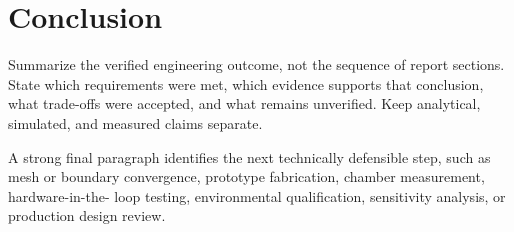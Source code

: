 \chapter{Conclusion}

Summarize the verified engineering outcome, not the sequence of report sections. State
which requirements were met, which evidence supports that conclusion, what trade-offs
were accepted, and what remains unverified. Keep analytical, simulated, and measured
claims separate.

A strong final paragraph identifies the next technically defensible step, such as mesh
or boundary convergence, prototype fabrication, chamber measurement, hardware-in-the-
loop testing, environmental qualification, sensitivity analysis, or production design
review.
